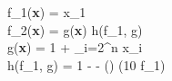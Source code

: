f_1(\textbf{x}) = x_1 \\
f_2(\textbf{x}) = g(\textbf{x}) h(f_1, g) \\
g(\textbf{x}) = 1 +  \sum_{i=2}^{n} x_i \\
h(f_1, g) = 1 -  - \left(\right) \sin(10 \pi f_1)
